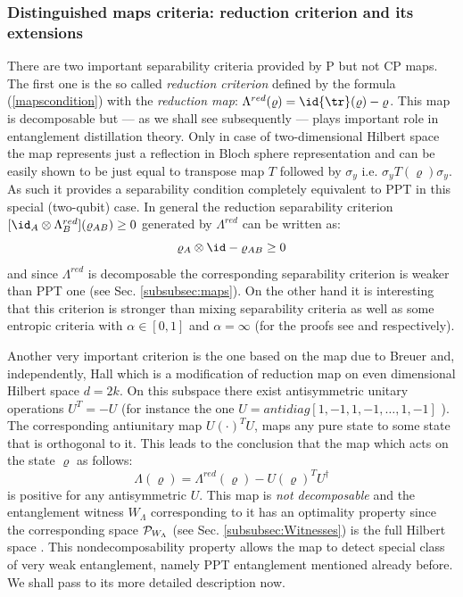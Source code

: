 \documentclass[twocolumn,aps,rmp]{revtex4}
\begin{document}
\subsubsection{Distinguished maps criteria: reduction criterion and its extensions
\label{subsubsec:Reduction}}

There are two important separability criteria provided by P but not CP maps.
The first one is the so called {\it reduction criterion}
\cite{reduction,CerfAG} defined by the formula (\ref{mapscondition})
with the {\it reduction map}: $\Lambda^{red}(\varrho)= \id
{\tr}(\varrho)-\varrho$. This map is decomposable but --- as we shall
see subsequently --- plays important role in entanglement distillation
theory\cite{reduction}.  Only in case of two-dimensional Hilbert space
the map represents just a reflection in Bloch sphere representation
\cite{BengtssonZyczkowski-book} and can be easily shown to be just
equal to transpose map $T$ followed by $\sigma_y$
i.e. $\sigma_yT(\varrho)\sigma_y$. As such it provides a separability
condition completely equivalent to PPT in this special (two-qubit)
case. In general the reduction separability criterion $[\id_{A}
\otimes \Lambda^{red}_{B}](\varrho_{AB})\geq 0$ generated by
$\Lambda^{red}$ can be written as:
\begin{equation} \varrho_{A} \otimes \id
-\varrho_{AB}\geq 0
\end{equation}
and since $\Lambda^{red}$ is decomposable \cite{reduction} the
corresponding separability criterion is weaker than PPT one (see
Sec. \ref{subsubsec:maps}). On the other hand it is interesting that
this criterion is stronger \cite{Hiroshima} than mixing separability
criteria \cite{NielsenKempe} as well as some entropic criteria with
$\alpha \in [0,1]$ and $\alpha=\infty$ (for the proofs see
\cite{VollbrechtW} and \cite{reduction} respectively).

Another very important criterion is the one based on the map due to
Breuer and, independently, Hall \cite{Breuer2006-prl,Hall2006} which
is a modification of reduction map on even dimensional Hilbert space
$d=2k$. On this subspace there exist antisymmetric unitary operations
$U^{T}=-U$ (for instance the one $U=antidiag[1,-1,1,-1,\ldots,1,-1]$
\cite{Breuer2006-prl}). The corresponding antiunitary map
$U(\cdot)^{T}U$, maps any pure state to some state that is orthogonal
to it. This leads to the conclusion that the map which acts on the
state $\varrho$ as follows:
\begin{equation}
\Lambda(\varrho)=\Lambda^{red}(\varrho)-U(\varrho)^{T}U^{\dagger}
\end{equation}
is positive for any antisymmetric $U$. This map is {\it not
  decomposable} and the entanglement witness $W_{\Lambda}$ corresponding to it has an optimality property since the corresponding space ${\cal P}_{W_{\Lambda}}$
(see Sec. \ref{subsubsec:Witnesses}) is the full Hilbert space
\cite{Breuer2006-jpamg}. This nondecomposability property allows the
map to detect special class of very weak entanglement, namely PPT
entanglement mentioned already before. We shall pass to its more
detailed description now.
\end{document}
